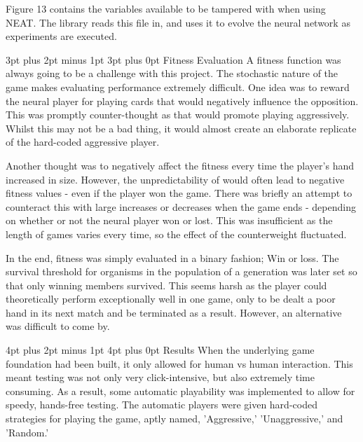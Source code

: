 \documentclass[12pt,a4paper]{article}
\makeatletter
\renewcommand\subsection{\@startsection {subsection}{1}{2mm} %
                               {3pt plus 2pt minus 1pt} %
                               {3pt plus 0pt} %
                               {\normalfont\bfseries}}
\renewcommand\section{\@startsection {section}{1}{0mm} %
                               {4pt plus 2pt minus 1pt} %
                               {4pt plus 0pt} %
                               {\bfseries}}
\makeatother
\begin{document}
Figure 13 contains the variables available to be tampered with when using NEAT. The library reads this file in, and uses it to evolve the neural network as experiments are executed. 



\newpage
\subsection{Fitness Evaluation}
A fitness function was always going to be a challenge with this project. The stochastic nature of the game makes evaluating performance extremely difficult. One idea was to reward the neural player for playing cards that would negatively influence the opposition. This was promptly counter-thought as that would promote playing aggressively. Whilst this may not be a bad thing, it would almost create an elaborate replicate of the hard-coded aggressive player. 

Another thought was to negatively affect the fitness every time the player's hand increased in size. However, the unpredictability of would often lead to negative fitness values - even if the player won the game. There was briefly an attempt to counteract this with large increases or decreases when the game ends - depending on whether or not the neural player won or lost. This was insufficient as the length of games varies every time, so the effect of the counterweight fluctuated.

In the end, fitness was simply evaluated in a binary fashion; Win or loss. The survival threshold for organisms in the population of a generation was later set so that only winning members survived. This seems harsh as the player could theoretically perform exceptionally well in one game, only to be dealt a poor hand in its next match and be terminated as a result. However, an alternative was difficult to come by.



\newpage
\section{Results}
When the underlying game foundation had been built, it only allowed for human vs human interaction. This meant testing was not only very click-intensive, but also extremely time consuming. As a result, some automatic playability was implemented to allow for speedy, hands-free testing. The automatic players were given hard-coded strategies for playing the game, aptly named, 'Aggressive,' 'Unaggressive,' and 'Random.' 
\end{document}
